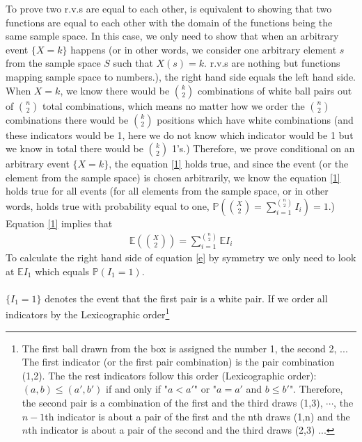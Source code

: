 \begin{exercise} [BH.4.48]
\begin{solution}
\begin{enumerate}
    To prove two r.v.s are equal to each other, is equivalent to showing that two functions are equal to each other with the domain of the functions being the same sample space. In this case, we only need to show that when an arbitrary event $\{X=k\}$ happens (or in other words, we consider one arbitrary element $s$ from the sample space $S$ such that $X(s)=k$. r.v.s are nothing but functions mapping sample space to numbers.), the right hand side equals the left hand side.   When $X=k$, we know there would be $\binom{k}{2}$ combinations of white ball pairs out of $\binom{n}{2}$ total combinations,  which means no matter how  we order the $\binom{n}{2}$ combinations there would be $\binom{k}{2}$ positions which have white combinations (and these indicators would be 1, here we do not know which indicator would be 1 but we know in total there would be $\binom{k}{2}$ 1's.) Therefore, we prove conditional on an arbitrary event $\{X=k\}$, the equation \eqref{1} holds true, and since the event (or the element from the sample space) is chosen arbitrarily, we know  the equation \eqref{1} holds true for all events (for all elements from the sample space, or in other words, holds true with probability equal to one, $\mathbb{P}\left(\binom{X}{2}= \sum_{i=1}^{\binom{n}{2}} I_i \right)=1$.)\\
    Equation \eqref{1} implies that 
    \begin{align}
        \mathbb{E}\left(\binom{X}{2}\right) = \sum_{i=1}^{\binom{n}{2}}\mathbb{E} I_i \label{e}
    \end{align}
    To calculate the right hand side of equation \eqref{e} by symmetry we only need to look at $\mathbb{E} I_1$ which equals $\mathbb{P}(I_1=1)$. \\~\\
    $\{I_1=1\}$  denotes the event that the first pair is a white pair. If we order all indicators by the Lexicographic order\footnote{The first ball drawn from the box is assigned the number 1, the second 2, ...  
    The first indicator (or the first pair combination) is the pair combination (1,2). The the rest 
    indicators follow this order (Lexicographic order): $(a,b)\leq (a',b')$ if and only if "$a<a'$" or "$a=a'$ and $b\leq b'$". Therefore, the second pair is a combination of the first and the third draws (1,3), $\cdots$, the $n-1$th indicator is about a pair of the first and the nth draws (1,n) and the $n$th indicator is about a pair of the second and the third draws (2,3) ...
    
}
\end{enumerate}
\end{solution}
\end{exercise}
